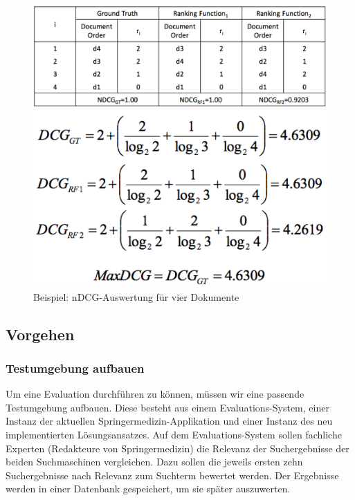 \begin{figure}[H]
\centering
\vspace{-1em}
\caption[Beispiel: nDCG-Auswertung für vier Dokumente -  Quelle des Bildes: http://
web.stanford.edu/class/cs276/handouts/EvaluationNew.handout-6-per.pdf]{Beispiel: nDCG-Auswertung für vier Dokumente}
\label{fig:nDCG-Beispie}
\begin{minipage}{0.55\linewidth}
		\vspace{.5em}
        \centering
		\includegraphics[width=.8\linewidth]{gfx/NDCGBeispiel}
		\vspace{-2em}
\end{minipage}
\hfill
\begin{minipage}{0.35\linewidth}
		\centering
		\includegraphics[width=.75\linewidth]{gfx/DCGBerechnung}
		\vspace{-3.5em}
\end{minipage}
\end{figure}

\subsection{Vorgehen}
\label{sec:Evaluation:Aufbau:Vorgehen}

\subsubsection{Testumgebung aufbauen}
\label{sec:Evaluation:Aufbau:Vorgehen:Aufbau}

Um eine Evaluation durchführen zu können, müssen wir eine passende Testumgebung aufbauen. Diese besteht aus einem Evaluations-System, einer Instanz der aktuellen Springermedizin-Applikation und einer Instanz des neu implementierten Lösungsansatzes. Auf dem Evaluations-System sollen fachliche Experten (Redakteure von Springermedizin) die Relevanz der Suchergebnisse der beiden Suchmaschinen vergleichen. Dazu sollen die jeweils ersten zehn Suchergebnisse nach Relevanz zum Suchterm bewertet werden. Der Ergebnisse werden in einer Datenbank gespeichert, um sie später auszuwerten. 

